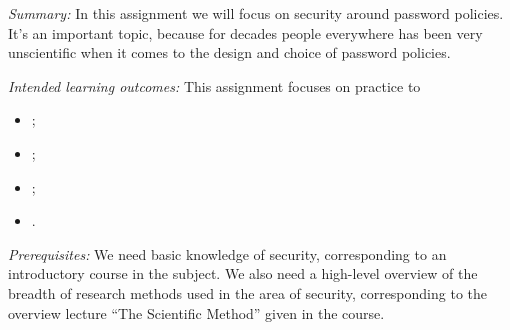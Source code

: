 
\emph{Summary:}
In this assignment we will focus on security around password policies.
It's an important topic, because for decades people everywhere has been very 
unscientific when it comes to the design and choice of password 
policies\autocite{Estes2017Aug}.

\emph{Intended learning outcomes:}
This assignment focuses on practice to
\begin{itemize}
  \item \LOrelate;
  \item \LOevaluate;
  \item \LOapply;
  \item \LOcomm.
\end{itemize}

\emph{Prerequisites:}
We need basic knowledge of security, corresponding to an introductory course in 
the subject.
We also need a high-level overview of the breadth of research methods used in 
the area of security, corresponding to the overview lecture \enquote{The 
Scientific Method} given in the course.
